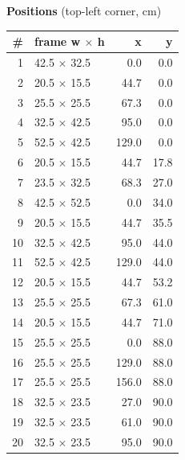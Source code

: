 \documentclass[a4paper,landscape,10pt]{article}
\begin{document}
\begin{minipage}[t]{0.25\textwidth}
\vspace{8pt}
{\bfseries Positions} (top-left corner, cm)\\[2pt]
\tiny
\begin{tabular}{@{}r l r r@{}}
\toprule
\# & frame w $\times$ h & x & y \\
\midrule
1 & 42.5 $\times$ 32.5 & 0.0 & 0.0 \\
2 & 20.5 $\times$ 15.5 & 44.7 & 0.0 \\
3 & 25.5 $\times$ 25.5 & 67.3 & 0.0 \\
4 & 32.5 $\times$ 42.5 & 95.0 & 0.0 \\
5 & 52.5 $\times$ 42.5 & 129.0 & 0.0 \\
6 & 20.5 $\times$ 15.5 & 44.7 & 17.8 \\
7 & 23.5 $\times$ 32.5 & 68.3 & 27.0 \\
8 & 42.5 $\times$ 52.5 & 0.0 & 34.0 \\
9 & 20.5 $\times$ 15.5 & 44.7 & 35.5 \\
10 & 32.5 $\times$ 42.5 & 95.0 & 44.0 \\
11 & 52.5 $\times$ 42.5 & 129.0 & 44.0 \\
12 & 20.5 $\times$ 15.5 & 44.7 & 53.2 \\
13 & 25.5 $\times$ 25.5 & 67.3 & 61.0 \\
14 & 20.5 $\times$ 15.5 & 44.7 & 71.0 \\
15 & 25.5 $\times$ 25.5 & 0.0 & 88.0 \\
16 & 25.5 $\times$ 25.5 & 129.0 & 88.0 \\
17 & 25.5 $\times$ 25.5 & 156.0 & 88.0 \\
18 & 32.5 $\times$ 23.5 & 27.0 & 90.0 \\
19 & 32.5 $\times$ 23.5 & 61.0 & 90.0 \\
20 & 32.5 $\times$ 23.5 & 95.0 & 90.0 \\
\bottomrule
\end{tabular}
\end{minipage}
\clearpage
\end{document}
